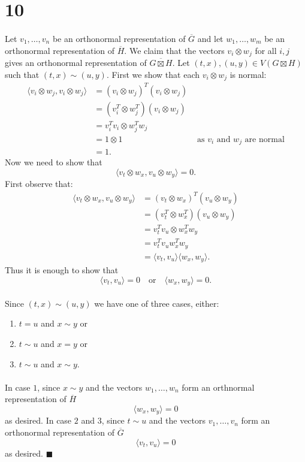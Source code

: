 \documentclass[letterpaper,12pt,oneside,onecolumn]{article}
\newcommand{\1}{\mathbbm{1}}
\begin{document}
\section*{10}
\paragraph{}
Let $v_1, \dots, v_n$ be an orthonormal representation of $\overline{G}$ and let $w_1, \dots, w_m$ be an orthonormal representation of $\overline{H}$. We claim that the vectors $v_i \otimes w_j$ for all $i,j$ gives an orthonormal representation of $\overline{G \boxtimes H}$. Let $(t,x), (u,y) \in V(G\boxtimes H)$ such that $(t,x) \sim (u,y)$. First we show that each $v_i \otimes w_j$ is normal:
\begin{align*}
\langle v_i \otimes w_j, v_i \otimes w_j \rangle &= (v_i \otimes w_j)^T (v_i \otimes w_j) \\
&= (v_i^T \otimes w_j^T)(v_i \otimes w_j) \\
&= v_i^Tv_i \otimes w_j^Tw_j \\
&= 1 \otimes 1 &\text{ as $v_i$ and $w_j$ are normal} \\
&= 1.
\end{align*}
Now we need to show that $$\langle v_t \otimes w_x, v_u \otimes w_y \rangle = 0.$$
First observe that:
\begin{align*}\langle v_t \otimes w_x, v_u \otimes w_y \rangle &= (v_t \otimes w_x)^T(v_u \otimes w_y) \\
&= (v_t^T \otimes w_x^T) (v_u \otimes w_y) \\
&= v_t^Tv_u \otimes w_x^Tw_y \\
&= v_t^Tv_u w_x^Tw_y \\
&= \langle v_t, v_u \rangle \langle w_x, w_y \rangle.
\end{align*}
Thus it is enough to show that 
$$\langle v_t, v_u \rangle = 0 \quad\text{or}\quad \langle w_x, w_y \rangle = 0.$$
\paragraph{}
Since $(t,x) \sim (u,y)$ we have one of three cases, either:
\begin{enumerate}
\item $t=u$ and $x \sim y$ or
\item $t\sim u$ and $x = y$ or
\item $t\sim u$ and $x \sim y$.
\end{enumerate}
\paragraph{}
In case $1$, since $x\sim y$ and the vectors $w_1, \dots, w_n$ form an orthnormal representation of $\overline{H}$
$$\langle w_x, w_y \rangle  = 0$$
as desired. In case $2$ and $3$, since $t \sim u$ and the vectors $v_1, \dots, v_n$ form an orthonormal representation of $\overline{G}$
$$\langle v_t, v_u \rangle = 0$$
as desired. $\blacksquare$
\end{document}
